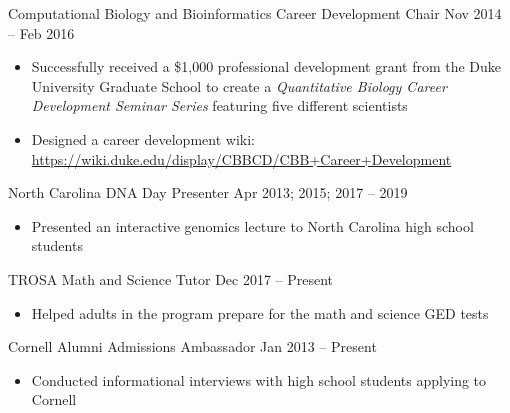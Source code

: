 

\begin{resentries}

  \leadershipentry
    {Computational Biology and Bioinformatics Career Development Chair} %
    {Nov 2014 -- Feb 2016} %
     {
      \begin{itemize}[leftmargin=*, itemsep=-1.5mm]
			\item{Successfully received a \$1,000 professional development grant from the Duke University Graduate School to create a \textit{Quantitative Biology Career Development Seminar Series} featuring five different scientists}
        	\item{Designed a career development wiki: \href{https://wiki.duke.edu/display/CBBCD/CBB+Career+Development}{\color{blue} https://wiki.duke.edu/display/CBBCD/CBB+Career+Development}}
	  \end{itemize}
	 }

  \leadershipentry
    {North Carolina DNA Day Presenter}
    {Apr 2013; 2015; 2017 -- 2019} %
     {
      \begin{itemize}[leftmargin=*, itemsep=-1.5mm]
			\item{Presented an interactive genomics lecture to North Carolina high school students}
	  \end{itemize}
	 }

  \leadershipentry
    {TROSA Math and Science Tutor}
    {Dec 2017 -- Present} %
     {
      \begin{itemize}[leftmargin=*, itemsep=-1.5mm]
			\item{Helped adults in the program prepare for the math and science GED tests}
		\end{itemize}
	 }

  \leadershipentry
    {Cornell Alumni Admissions Ambassador}
    {Jan 2013 -- Present} %
     {
		\begin{itemize}[leftmargin=*, itemsep=-1.5mm]
			\item{Conducted informational interviews with high school students applying to Cornell}
		\end{itemize}
	 }



\end{resentries}
